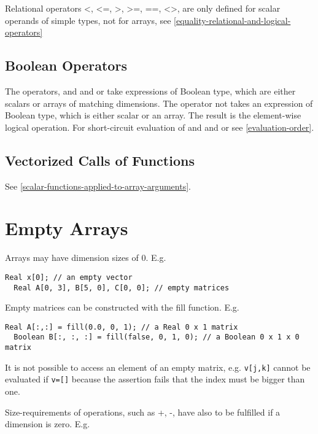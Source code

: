Relational operators \textless{}, \textless{}=, \textgreater{},
\textgreater{}=, ==, \textless{}\textgreater{}, are only defined for
scalar operands of simple types, not for arrays, see \autoref{equality-relational-and-logical-operators}

\subsection{Boolean Operators}

The operators, and and or take expressions of Boolean type, which are
either scalars or arrays of matching dimensions. The operator not takes
an expression of Boolean type, which is either scalar or an array. The
result is the element-wise logical operation. For short-circuit
evaluation of and and or see \autoref{evaluation-order}.

\subsection{Vectorized Calls of Functions}

See \autoref{scalar-functions-applied-to-array-arguments}.

\section{Empty Arrays}

Arrays may have dimension sizes of 0. E.g.

\begin{lstlisting}[language=modelica]
  Real x[0]; // an empty vector
  Real A[0, 3], B[5, 0], C[0, 0]; // empty matrices
\end{lstlisting}
Empty matrices can be constructed with the fill function. E.g.

\begin{lstlisting}[language=modelica]
  Real A[:,:] = fill(0.0, 0, 1); // a Real 0 x 1 matrix
  Boolean B[:, :, :] = fill(false, 0, 1, 0); // a Boolean 0 x 1 x 0 matrix
\end{lstlisting}
It is not possible to access an element of an empty matrix, e.g.
  \lstinline!v[j,k]! cannot be evaluated if \lstinline!v=[]! because the assertion fails
that the index must be bigger than one.

Size-requirements of operations, such as +, -, have also to be fulfilled
if a dimension is zero. E.g.

